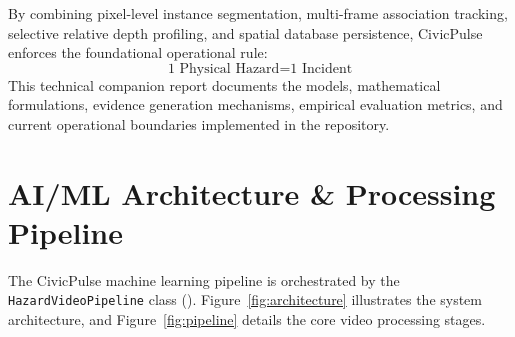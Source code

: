 \documentclass[12pt,a4paper]{article}
\begin{document}
By combining pixel-level instance segmentation, multi-frame association tracking, selective relative depth profiling, and spatial database persistence, CivicPulse enforces the foundational operational rule:
\begin{equation}
\boxed{\text{1 Physical Hazard} = \text{1 Incident}}
\end{equation}
This technical companion report documents the models, mathematical formulations, evidence generation mechanisms, empirical evaluation metrics, and current operational boundaries implemented in the repository.

\section{AI/ML Architecture \& Processing Pipeline}

The CivicPulse machine learning pipeline is orchestrated by the \texttt{HazardVideoPipeline} class (). Figure~\ref{fig:architecture} illustrates the system architecture, and Figure~\ref{fig:pipeline} details the core video processing stages.
\end{document}
